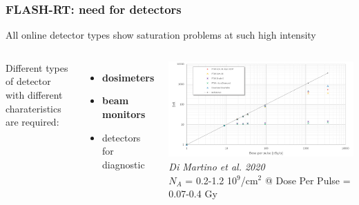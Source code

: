    \begin{frame}
        \frametitle{FLASH-RT: need for detectors}
        All online detector types show saturation problems at such high intensity
        \medskip
        \begin{columns}
            Different types of detector with different charateristics are required: 
                \begin{itemize}
                    \item \textbf{dosimeters} 
                    \item \textbf{beam monitors} 
                    \item detectors for diagnostic 
                \end{itemize}
                \hspace*{-0.6cm}
                \includegraphics[width=1.15\linewidth]{figures/pixel_detectors_usage/saturation_dosimeters.pdf}
                \centering\textit{Di Martino et al. 2020}\\\bigskip
                \hspace*{-3.cm}$N_A$ = 0.2-1.2 10$^9$/cm$^2$ @ Dose Per Pulse = 0.07-0.4 Gy
        \end{columns}
    \end{frame}     

